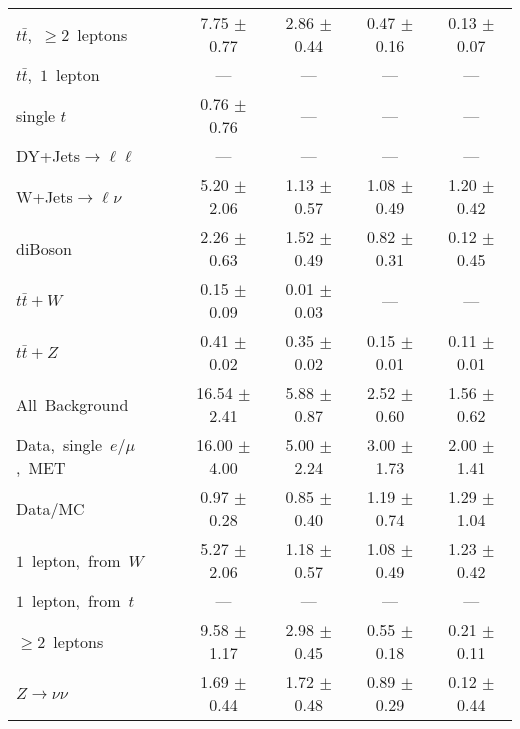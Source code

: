\documentclass{article}
\begin{document}
\begin{longtable}{|l|c|c|c|c|}
$t\bar{t}$,~$\ge2$~leptons & 7.75 $\pm$ 0.77  & 2.86 $\pm$ 0.44  & 0.47 $\pm$ 0.16  & 0.13 $\pm$ 0.07 \\* 
$t\bar{t}$,~$1$~lepton & ---  & ---  & ---  & --- \\* 
single $t$  & 0.76 $\pm$ 0.76  & ---  & ---  & --- \\* 
DY+Jets$\rightarrow\ell\ell$  & ---  & ---  & ---  & --- \\* 
W+Jets$\rightarrow\ell\nu$  & 5.20 $\pm$ 2.06  & 1.13 $\pm$ 0.57  & 1.08 $\pm$ 0.49  & 1.20 $\pm$ 0.42 \\* 
diBoson  & 2.26 $\pm$ 0.63  & 1.52 $\pm$ 0.49  & 0.82 $\pm$ 0.31  & 0.12 $\pm$ 0.45 \\* 
$t\bar{t}+W$  & 0.15 $\pm$ 0.09  & 0.01 $\pm$ 0.03  & ---  & --- \\* 
$t\bar{t}+Z$  & 0.41 $\pm$ 0.02  & 0.35 $\pm$ 0.02  & 0.15 $\pm$ 0.01  & 0.11 $\pm$ 0.01 \\* 
\hline \hline 
All~Background  & 16.54 $\pm$ 2.41  & 5.88 $\pm$ 0.87  & 2.52 $\pm$ 0.60  & 1.56 $\pm$ 0.62 \\* 
Data,~single~$e/\mu$,~MET  & 16.00 $\pm$ 4.00  & 5.00 $\pm$ 2.24  & 3.00 $\pm$ 1.73  & 2.00 $\pm$ 1.41 \\* 
Data/MC  & 0.97 $\pm$ 0.28  & 0.85 $\pm$ 0.40  & 1.19 $\pm$ 0.74  & 1.29 $\pm$ 1.04 \\* 
\hline \hline 
$1$~lepton,~from~$W$  & 5.27 $\pm$ 2.06  & 1.18 $\pm$ 0.57  & 1.08 $\pm$ 0.49  & 1.23 $\pm$ 0.42 \\* 
$1$~lepton,~from~$t$  & ---  & ---  & ---  & --- \\* 
$\ge2$~leptons  & 9.58 $\pm$ 1.17  & 2.98 $\pm$ 0.45  & 0.55 $\pm$ 0.18  & 0.21 $\pm$ 0.11 \\* 
$Z\rightarrow\nu\nu$  & 1.69 $\pm$ 0.44  & 1.72 $\pm$ 0.48  & 0.89 $\pm$ 0.29  & 0.12 $\pm$ 0.44 \\* 
\hline 
\end{longtable} 

 
 
 
 
\pagebreak 

 
 
 
 
\end{document}
